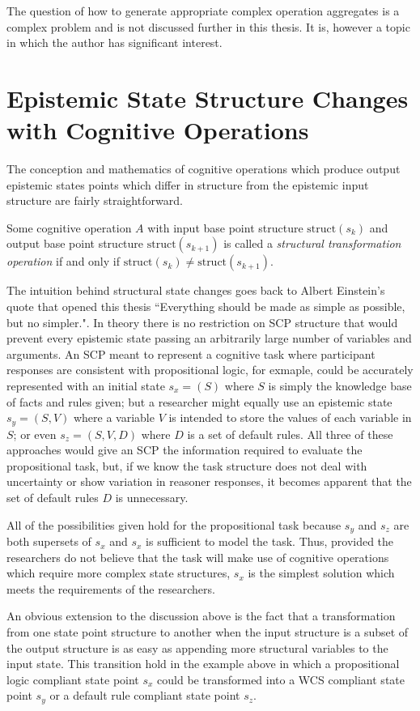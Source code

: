 The question of how to generate appropriate complex operation aggregates is a complex problem and is not discussed further in this thesis. It is, however a topic in which the author has significant interest.


\section{Epistemic State Structure Changes with Cognitive Operations}
The conception and mathematics of cognitive operations which produce output epistemic states points which differ in structure from the epistemic input structure are fairly straightforward.

Some cognitive operation $A$ with input base point structure $\textrm{struct}(s_k)$ and output base point structure $\textrm{struct}(s_{k+1})$ is called a \textit{structural transformation operation} if and only if $\textrm{struct}(s_k) \ne \textrm{struct}(s_{k+1})$.

The intuition behind structural state changes goes back to Albert Einstein's quote that opened this thesis ``Everything should be made as simple as possible, but no simpler.". In theory there is no restriction on SCP structure that would prevent every epistemic state passing an arbitrarily large number of variables and arguments. An SCP meant to represent a cognitive task where participant responses are consistent with propositional logic, for exmaple, could be accurately represented with an initial state $s_x=(S)$ where $S$ is simply the knowledge base of facts and rules given; but a researcher might equally use an epistemic state $s_y=(S,V)$ where a variable $V$ is intended to store the values of each variable in $S$; or even $s_z=(S,V,D)$ where $D$ is a set of default rules. All three of these approaches would give an SCP the information required to evaluate the propositional task, but, if we know the task structure does not deal with uncertainty or show variation in reasoner responses, it becomes apparent that the set of default rules $D$ is unnecessary.

All of the possibilities given hold for the propositional task because $s_y$ and $s_z$ are both supersets of $s_x$ and $s_x$ is sufficient to model the task. Thus, provided the researchers do not believe that the task will make use of cognitive operations which require more complex state structures, $s_x$ is the simplest solution which meets the requirements of the researchers.

An obvious extension to the discussion above is the fact that a transformation from one state point structure to another when the input structure is a subset of the output structure is as easy as appending more structural variables to the input state. This transition hold in the example above in which a propositional logic compliant state point $s_x$ could be transformed into a WCS compliant state point $s_y$ or a default rule compliant state point $s_z$.

